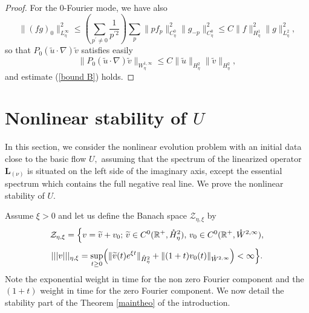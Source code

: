 \documentclass[11pt]{article}
\begin{document}
\begin{proof}
For the 0-Fourier mode, we have also%
\begin{equation*}
\|(fg)_{0}\|_{L_{\eta}^{\infty }}^{2}\leq \left( \sum_{p^{\prime }\neq 0}\frac{1%
}{p^{\prime 2}}\right)
\sum_{p}\|pf_{p}\|_{C_{\eta}^{0}}^{2}\|g_{-p}\|_{C_{\eta}^{0}}^{2}\leq
C\|f\|_{H_{\eta}^{1}}^{2}\|g\|_{L_{\eta}^{2}}^{2},
\end{equation*}%
so that $P_{0}(\widetilde{u}\cdot \nabla )\widetilde{v}$ satisfies easily%
\begin{equation*}
\|P_{0}(\widetilde{u}\cdot \nabla )\widetilde{v}\|_{W_{\eta}^{1,\infty }}\leq
C\|\widetilde{u}\|_{H_{\eta}^{2}}\|\widetilde{v}\|_{H_{\eta}^{2}},
\end{equation*}%
and estimate (\ref{bound B}) holds.
\end{proof}





\section{Nonlinear stability of $U$}





In this section, we consider the nonlinear evolution problem with an initial
data close to the basic flow $U,$  assuming that the spectrum of the
linearized operator $\boldsymbol{L}_{(\nu )}$ is situated on the left side
of the imaginary axis, except the essential spectrum which contains the full
negative real line. We prove the nonlinear stability of $U.$

Assume $\xi >0$ and let us define the Banach space $\mathcal{Z}_{\eta,\xi}$ by%
\begin{equation*}
\mathcal{Z}_{\eta,\xi }=\Bigl\{ v=\widetilde{v}+v_{0}; \, \widetilde{v}\in C^{0}(%
\mathbb{R}^{+},\mathring{H}_{\eta}^{2}), \, v_{0}\in C^{0}(\mathbb{R}^{+},\mathring{%
W}^{2,\infty }),
\end{equation*}%
\begin{equation*}
 |||v|||_{\eta,\xi  }=\underset{t\geq 0}{\sup } \Bigl( \|\widetilde{v}(t)e^{\xi t}\|_{\mathring{H}_{\eta}^{2}}
+ \|(1+t)v_{0}(t) \|_{\mathring{W}^{2,\infty}} \Bigr)<\infty \Bigr\}.
\end{equation*}%
Note the exponential weight in time for the non zero Fourier component and the $(1+t)$ weight
in time for the zero Fourier component.
We now detail the stability part of the Theorem \ref{maintheo} of the introduction.
\end{document}
